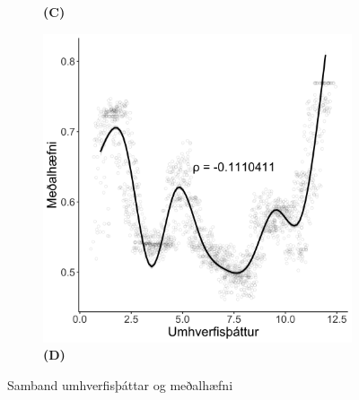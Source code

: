 \documentclass[12pt]{article}
\begin{document}
\begin{figure}[h]
\begin{subfigure}{.5\textwidth}
        \caption*{\bfseries (C)}
    \end{subfigure}%
    \begin{subfigure}{.5\textwidth}
        \centering
        \includegraphics[width=\textwidth]{img/plotD.png}
        \caption*{\bfseries (D)}
    \end{subfigure}%
    \caption{Samband umhverfisþáttar og meðalhæfni}
\end{figure}
\end{document}
